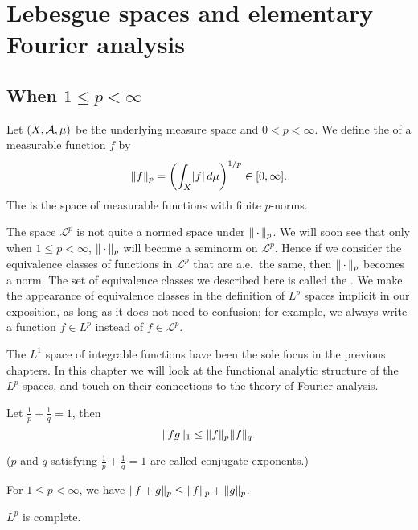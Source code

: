 \chapter{Lebesgue spaces and elementary Fourier analysis} \label{chap:Leb-spaces}
\section{When \texorpdfstring{$1 \leq p < \infty$}{1 <= p < infinity}} \label{sec:Lp-1-infty}
Let $(X,\mathcal{A},\mu)$ be the underlying measure space and $0< p < \infty$. We define the  of a measurable function $f$ by \[
    \lVert f \rVert_{p} = \biggl(\int_X \lvert f \rvert\,d\mu\biggr)^{1/p} \in [0,\infty].
\] The  is the space of measurable functions with finite $p$-norms.

The space $\mathcal{L}^p$ is not quite a normed space under $\lVert \,\cdot\, \rVert_p$. We will soon see that only when $1 \leq p < \infty$, $\lVert \,\cdot\, \rVert_p$ will become a seminorm on $\mathcal{L}^p$. Hence if we consider the equivalence classes of functions in $\mathcal{L}^p$ that are a.e.\ the same, then $\lVert \,\cdot\, \rVert_p$ becomes a norm. The set of equivalence classes we described here is called the . We make the appearance of equivalence classes in the definition of $L^p$ spaces implicit in our exposition, as long as it does not need to confusion; for example, we always write a function $f \in L^p$ instead of $f \in \mathcal{L}^p$.

The $L^1$ space of integrable functions have been the sole focus in the previous chapters. In this chapter we will look at the functional analytic structure of the $L^p$ spaces, and touch on their connections to the theory of Fourier analysis.

\begin{namedthm} \label{thm:Holder-ineq}
    Let $\frac{1}{p} + \frac{1}{q} = 1$, then \[
        \lVert fg \rVert_1 \leq \lVert f \rVert_p\lVert f \rVert_q.
    \]

    ($p$ and $q$ satisfying $\frac{1}{p} + \frac{1}{q} = 1$ are called conjugate exponents.)
\end{namedthm}

\begin{namedthm} \label{thm:Minkowski-ineq}
    For $1 \leq p < \infty$, we have $\lVert f+g \rVert_p \leq \lVert f \rVert_p + \lVert g \rVert_p$.
\end{namedthm}

\begin{thm}
    $L^p$ is complete.
\end{thm}


